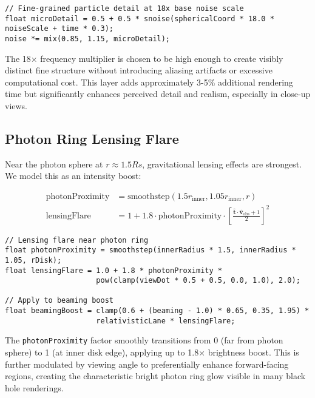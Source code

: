 \documentclass[12pt,a4paper]{article}
\theoremstyle{definition}
\theoremstyle{remark}
\begin{document}
\begin{lstlisting}[style=metalstyle, caption=Micro-turbulence detail]
// Fine-grained particle detail at 18x base noise scale
float microDetail = 0.5 + 0.5 * snoise(sphericalCoord * 18.0 * noiseScale + time * 0.3);
noise *= mix(0.85, 1.15, microDetail);
\end{lstlisting}

The 18× frequency multiplier is chosen to be high enough to create visibly distinct fine structure without introducing aliasing artifacts or excessive computational cost. This layer adds approximately 3-5\% additional rendering time but significantly enhances perceived detail and realism, especially in close-up views.

\subsection{Photon Ring Lensing Flare}

Near the photon sphere at $r \approx 1.5 Rs$, gravitational lensing effects are strongest. We model this as an intensity boost:

\begin{align}
    \text{photonProximity} &= \text{smoothstep}(1.5 r_{\text{inner}}, 1.05 r_{\text{inner}}, r) \\
    \text{lensingFlare} &= 1 + 1.8 \cdot \text{photonProximity} \cdot \left[\frac{\hat{\mathbf{t}} \cdot \hat{\mathbf{v}}_{\text{obs}} + 1}{2}\right]^2
\end{align}

\begin{lstlisting}[style=metalstyle, caption=Lensing flare near photon ring]
// Lensing flare near photon ring
float photonProximity = smoothstep(innerRadius * 1.5, innerRadius * 1.05, rDisk);
float lensingFlare = 1.0 + 1.8 * photonProximity * 
                     pow(clamp(viewDot * 0.5 + 0.5, 0.0, 1.0), 2.0);

// Apply to beaming boost
float beamingBoost = clamp(0.6 + (beaming - 1.0) * 0.65, 0.35, 1.95) * 
                     relativisticLane * lensingFlare;
\end{lstlisting}

The \texttt{photonProximity} factor smoothly transitions from 0 (far from photon sphere) to 1 (at inner disk edge), applying up to 1.8× brightness boost. This is further modulated by viewing angle to preferentially enhance forward-facing regions, creating the characteristic bright photon ring glow visible in many black hole renderings.
\end{document}
